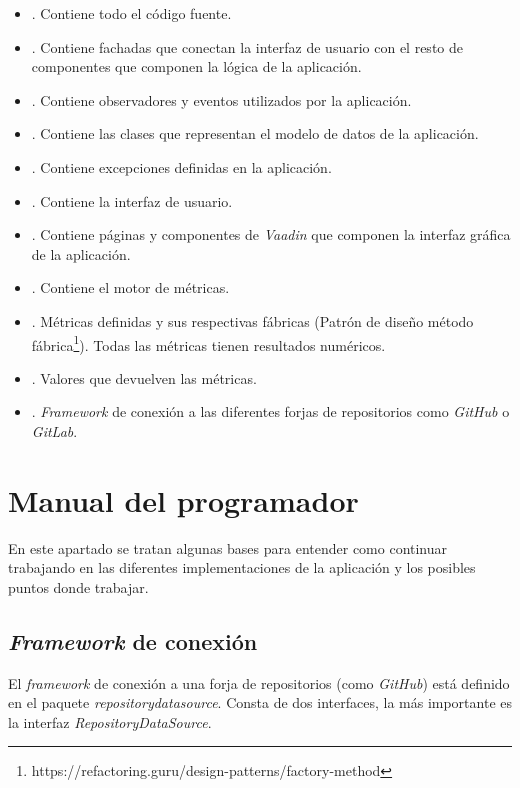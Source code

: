 \begin{itemize}
	\item {}. Contiene todo el código fuente.
	\item {}. Contiene fachadas que conectan la interfaz de usuario con el resto de componentes que componen la lógica de la aplicación.
	\item {}. Contiene observadores y eventos utilizados por la aplicación.
	\item {}. Contiene las clases que representan el modelo de datos de la aplicación.
	\item {}. Contiene excepciones definidas en la aplicación.
	\item {}. Contiene la interfaz de usuario.
	\item {}. Contiene páginas y componentes de \textit{Vaadin} que componen la interfaz gráfica de la aplicación.
	\item {}. Contiene el motor de métricas.
	\item {}. Métricas definidas y sus respectivas fábricas (Patrón de diseño método fábrica\footnote{https://refactoring.guru/design-patterns/factory-method}). Todas las métricas tienen resultados numéricos.
	\item {}. Valores que devuelven las métricas.
	\item {}. \textit{Framework} de conexión a las diferentes forjas de repositorios como \textit{GitHub} o \textit{GitLab}.
\end{itemize}

\newpage
\section{Manual del programador}
En este apartado se tratan algunas bases para entender como continuar trabajando en las diferentes implementaciones de la aplicación y los posibles puntos donde trabajar.

\subsection{\textit{Framework} de conexión}
El \textit{framework} de conexión a una forja de repositorios (como \textit{GitHub}) está definido en el paquete \textit{repositorydatasource}. Consta de dos interfaces, la más importante es la interfaz \textit{RepositoryDataSource}.


